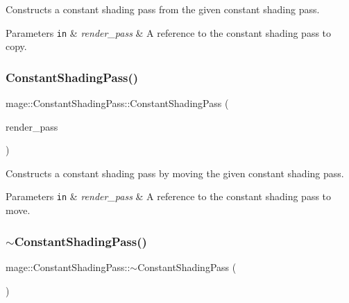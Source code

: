 Constructs a constant shading pass from the given constant shading pass.


\begin{DoxyParams}[1]{Parameters}
\mbox{\tt in}  & {\em render\+\_\+pass} & A reference to the constant shading pass to copy. \\
\hline
\end{DoxyParams}
\hypertarget{classmage_1_1_constant_shading_pass_afeb558851130d64579930be81198e946}{}\label{classmage_1_1_constant_shading_pass_afeb558851130d64579930be81198e946} 
\subsubsection{\texorpdfstring{Constant\+Shading\+Pass()}{ConstantShadingPass()}\hspace{0.1cm}{\footnotesize\ttfamily [3/3]}}
{\footnotesize\ttfamily mage\+::\+Constant\+Shading\+Pass\+::\+Constant\+Shading\+Pass (\begin{DoxyParamCaption}\item[{\hyperlink{classmage_1_1_constant_shading_pass}{Constant\+Shading\+Pass} \&\&}]{render\+\_\+pass }\end{DoxyParamCaption})\hspace{0.3cm}{\ttfamily [default]}}

Constructs a constant shading pass by moving the given constant shading pass.


\begin{DoxyParams}[1]{Parameters}
\mbox{\tt in}  & {\em render\+\_\+pass} & A reference to the constant shading pass to move. \\
\hline
\end{DoxyParams}
\hypertarget{classmage_1_1_constant_shading_pass_a2ef56dc45910519d5e0137b14768738e}{}\label{classmage_1_1_constant_shading_pass_a2ef56dc45910519d5e0137b14768738e} 
\subsubsection{\texorpdfstring{$\sim$\+Constant\+Shading\+Pass()}{~ConstantShadingPass()}}
{\footnotesize\ttfamily mage\+::\+Constant\+Shading\+Pass\+::$\sim$\+Constant\+Shading\+Pass (\begin{DoxyParamCaption}{ }\end{DoxyParamCaption})\hspace{0.3cm}{\ttfamily [default]}}

